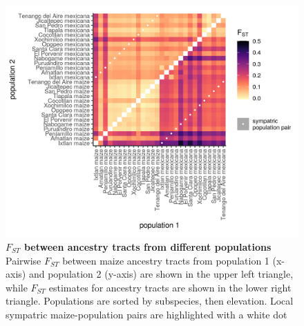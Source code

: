 \begin{figure}[ht]
\includegraphics[width=\textwidth]{chapter2/figures/fst_within_maize_or_mexicana_ancestry_genomewide_heatmap_both.png}
\caption{\color{Gray} \textbf{$F_{ST}$ between ancestry tracts from different populations} 
Pairwise $F_{ST}$ between maize ancestry tracts from population 1 (x-axis) and population 2 (y-axis) are shown in the upper left triangle, while $F_{ST}$ estimates for \mexicana ancestry tracts are shown in the lower right triangle. 
Populations are sorted by subspecies, then elevation. Local sympatric maize-\mexicana population pairs are highlighted with a white dot }
\label{fst_within_ancestry}
\end{figure}

